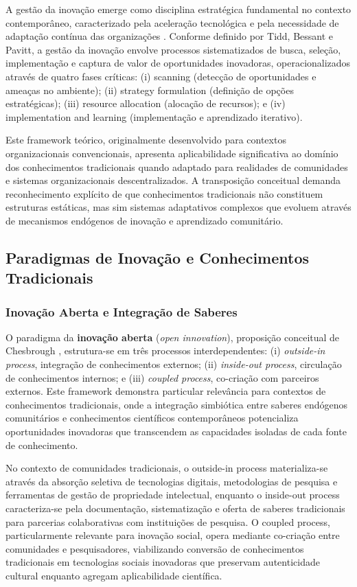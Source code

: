 A gestão da inovação emerge como disciplina estratégica fundamental no contexto contemporâneo, caracterizado pela aceleração tecnológica e pela necessidade de adaptação contínua das organizações \cite{Tidd2005}. Conforme definido por Tidd, Bessant e Pavitt, a gestão da inovação envolve processos sistematizados de busca, seleção, implementação e captura de valor de oportunidades inovadoras, operacionalizados através de quatro fases críticas: (i) scanning (detecção de oportunidades e ameaças no ambiente); (ii) strategy formulation (definição de opções estratégicas); (iii) resource allocation (alocação de recursos); e (iv) implementation and learning (implementação e aprendizado iterativo). 

Este framework teórico, originalmente desenvolvido para contextos organizacionais convencionais, apresenta aplicabilidade significativa ao domínio dos conhecimentos tradicionais quando adaptado para realidades de comunidades e sistemas organizacionais descentralizados. A transposição conceitual demanda reconhecimento explícito de que conhecimentos tradicionais não constituem estruturas estáticas, mas sim sistemas adaptativos complexos que evoluem através de mecanismos endógenos de inovação e aprendizado comunitário.

\subsection{Paradigmas de Inovação e Conhecimentos Tradicionais}

\subsubsection{Inovação Aberta e Integração de Saberes}

O paradigma da \textbf{inovação aberta} (\textit{open innovation}), proposição conceitual de Chesbrough \cite{Chesbrough2003}, estrutura-se em três processos interdependentes: (i) \textit{outside-in process}, integração de conhecimentos externos; (ii) \textit{inside-out process}, circulação de conhecimentos internos; e (iii) \textit{coupled process}, co-criação com parceiros externos. Este framework demonstra particular relevância para contextos de conhecimentos tradicionais, onde a integração simbiótica entre saberes endógenos comunitários e conhecimentos científicos contemporâneos potencializa oportunidades inovadoras que transcendem as capacidades isoladas de cada fonte de conhecimento.

No contexto de comunidades tradicionais, o outside-in process materializa-se através da absorção seletiva de tecnologias digitais, metodologias de pesquisa e ferramentas de gestão de propriedade intelectual, enquanto o inside-out process caracteriza-se pela documentação, sistematização e oferta de saberes tradicionais para parcerias colaborativas com instituições de pesquisa. O coupled process, particularmente relevante para inovação social, opera mediante co-criação entre comunidades e pesquisadores, viabilizando conversão de conhecimentos tradicionais em tecnologias sociais inovadoras que preservam autenticidade cultural enquanto agregam aplicabilidade científica.

